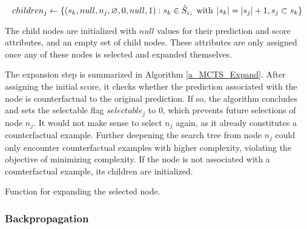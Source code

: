 \begin{equation}
    children_j \gets \{(s_k, null, n_j, \varnothing, 0, null, 1): s_k \in \hat{S}_{\varepsilon_i} \hspace{1.5mm} \mathrm{with} \hspace{1.5mm} |s_k| = |s_j| + 1, s_j \subset s_k\}
\end{equation}

The child nodes are initialized with $null$ values for their prediction and score attributes, and an empty set of child nodes. These attributes are only assigned once any of these nodes is selected and expanded themselves.

The expansion step is summarized in Algorithm \ref{a_MCTS_Expand}. After assigning the initial score, it checks whether the prediction associated with the node is counterfactual to the original prediction. If so, the algorithm concludes and sets the selectable flag $selectable_j$ to $0$, which prevents future selections of node $n_j$. It would not make sense to select $n_j$ again, as it already constitutes a counterfactual example. Further deepening the search tree from node $n_j$ could only encounter counterfactual examples with higher complexity, violating the objective of minimizing complexity. If the node is not associated with a counterfactual example, its children are initialized.

{
\setlength{\algomargin}{1.25em}
\begin{algorithm}[ht]
\caption{Function for expanding the selected node.}
\small
\label{a_MCTS_Expand}
\end{algorithm}
}

\subsubsection{Backpropagation}
\label{s_Methodology_CoDy_Backpropagation}

